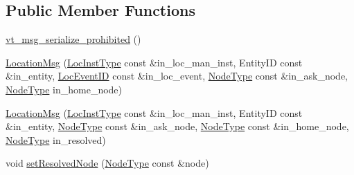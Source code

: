 \subsection*{Public Member Functions}
\begin{DoxyCompactItemize}
\item 
\hyperlink{structvt_1_1location_1_1_location_msg_a772844def532d4cbe03f197d621d501e}{vt\+\_\+msg\+\_\+serialize\+\_\+prohibited} ()
\item 
\hyperlink{structvt_1_1location_1_1_location_msg_af1b76aa81c81ed8ed2a9c9db4e5cff45}{Location\+Msg} (\hyperlink{namespacevt_1_1location_a4db6456e8024af2d23fc5ae560fef866}{Loc\+Inst\+Type} const \&in\+\_\+loc\+\_\+man\+\_\+inst, Entity\+ID const \&in\+\_\+entity, \hyperlink{namespacevt_1_1location_aa5ccc1a42aa22b0b41fcfbbdee314dca}{Loc\+Event\+ID} const \&in\+\_\+loc\+\_\+event, \hyperlink{namespacevt_a866da9d0efc19c0a1ce79e9e492f47e2}{Node\+Type} const \&in\+\_\+ask\+\_\+node, \hyperlink{namespacevt_a866da9d0efc19c0a1ce79e9e492f47e2}{Node\+Type} in\+\_\+home\+\_\+node)
\item 
\hyperlink{structvt_1_1location_1_1_location_msg_a1b7a6d54ba2fe0018480ca50475e8a66}{Location\+Msg} (\hyperlink{namespacevt_1_1location_a4db6456e8024af2d23fc5ae560fef866}{Loc\+Inst\+Type} const \&in\+\_\+loc\+\_\+man\+\_\+inst, Entity\+ID const \&in\+\_\+entity, \hyperlink{namespacevt_a866da9d0efc19c0a1ce79e9e492f47e2}{Node\+Type} const \&in\+\_\+ask\+\_\+node, \hyperlink{namespacevt_a866da9d0efc19c0a1ce79e9e492f47e2}{Node\+Type} const \&in\+\_\+home\+\_\+node, \hyperlink{namespacevt_a866da9d0efc19c0a1ce79e9e492f47e2}{Node\+Type} in\+\_\+resolved)
\item 
void \hyperlink{structvt_1_1location_1_1_location_msg_a98f01158208640bb88e0d4583694f9bb}{set\+Resolved\+Node} (\hyperlink{namespacevt_a866da9d0efc19c0a1ce79e9e492f47e2}{Node\+Type} const \&node)
\end{DoxyCompactItemize}
